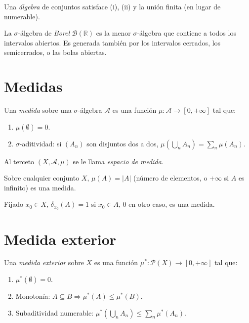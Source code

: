 \begin{definition}
\label{def:algebra}
Una \emph{álgebra} de conjuntos satisface (i), (ii) y la unión finita (en lugar de numerable).
\end{definition}

\begin{example}
\label{ej:borel}
La $\sigma$-álgebra de \emph{Borel} $\mathcal{B}(\mathbb{R})$ es la menor $\sigma$-álgebra que contiene a todos los intervalos abiertos. Es generada también por los intervalos cerrados, los semicerrados, o las bolas abiertas.
\end{example}

\section{Medidas}

\begin{definition}
\label{def:medida}
Una \emph{medida} sobre una $\sigma$-álgebra $\mathcal{A}$ es una función $\mu\colon\mathcal{A}\to[0,+\infty]$ tal que:
\begin{enumerate}
  \item[(i)] $\mu(\emptyset)=0$.
  \item[(ii)] $\sigma$-aditividad: si $(A_n)$ son disjuntos dos a dos, $\mu(\bigcup_n A_n)=\sum_n\mu(A_n)$.
\end{enumerate}
Al terceto $(X,\mathcal{A},\mu)$ se le llama \emph{espacio de medida}.
\end{definition}

\begin{example}
\label{ej:conteo}
Sobre cualquier conjunto $X$, $\mu(A)=|A|$ (número de elementos, o $+\infty$ si $A$ es infinito) es una medida.
\end{example}

\begin{example}
\label{ej:dirac-medida}
Fijado $x_0\in X$, $\delta_{x_0}(A)=1$ si $x_0\in A$, $0$ en otro caso, es una medida.
\end{example}

\section{Medida exterior}

\begin{definition}
\label{def:medida-exterior}
Una \emph{medida exterior} sobre $X$ es una función $\mu^*\colon\mathcal{P}(X)\to[0,+\infty]$ tal que:
\begin{enumerate}
  \item[(i)] $\mu^*(\emptyset)=0$.
  \item[(ii)] Monotonía: $A\subseteq B\Rightarrow\mu^*(A)\leq\mu^*(B)$.
  \item[(iii)] Subaditividad numerable: $\mu^*(\bigcup_n A_n)\leq\sum_n\mu^*(A_n)$.
\end{enumerate}
\end{definition}

